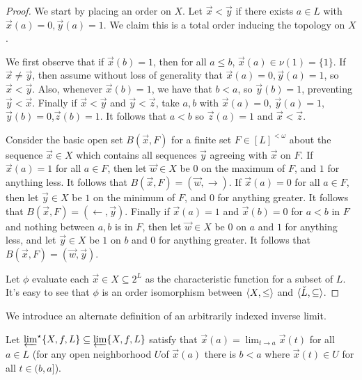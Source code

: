 \documentclass[11pt]{article}
\begin{document}
  \begin{proof}
    We start by placing an order on \(X\). Let \(\vec x<\vec y\) if
    there exists \(a\in L\) with \(\vec x(a)=0,\vec y(a)=1\). We claim this is
    a total order inducing the topology on \(X\).

    We first observe that if \(\vec x(b)=1\), then for all \(a\leq b\),
    \(\vec x(a)\in\nu(1)=\{1\}\). If \(\vec x\not=\vec y\), then assume
    without loss of generality that \(\vec x(a)=0,\vec y(a)=1\), so
    \(\vec x<\vec y\). Also, whenever \(\vec x(b)=1\), we have that \(b<a\),
    so \(\vec y(b)=1\), preventing \(\vec y<\vec x\). Finally if
    \(\vec x<\vec y\) and \(\vec y<\vec z\), take \(a,b\) with
    \(\vec x(a)=0\), \(\vec y(a)=1\),\(\vec y(b)=0\),\(\vec z(b)=1\). It
    follows that \(a<b\) so \(\vec z(a)=1\) and \(\vec x<\vec z\).

    Consider the basic open set \(B(\vec x,F)\) for a finite set
    \(F\in [L]^{<\omega}\)
    about the sequence \(\vec x\in X\) which contains all sequences
    \(\vec y\) agreeing with \(\vec x\) on \(F\). If \(\vec x(a)=1\) for all
    \(a\in F\), then let \(\vec w\in X\) be \(0\) on the maximum of \(F\),
    and \(1\) for anything less. It follows that
    \(B(\vec x,F)=(\vec w,\rightarrow)\). If \(\vec x(a)=0\) for all
    \(a\in F\), then let \(\vec y\in X\) be \(1\) on the minimum of \(F\),
    and \(0\) for anything greater. It follows that
    \(B(\vec x,F)=(\leftarrow,\vec y)\). Finally if \(\vec x(a)=1\) and
    \(\vec x(b)=0\) for \(a<b\) in \(F\) and nothing between \(a,b\) is in
    \(F\), then let \(\vec w\in X\) be \(0\) on \(a\)
    and \(1\) for anything less, and let \(\vec y\in X\) be \(1\) on \(b\)
    and \(0\) for anything greater. It follows that
    \(B(\vec x,F)=(\vec w,\vec y)\).

    Let \(\phi\) evaluate each \(\vec x\in X\subseteq 2^L\) as the
    characteristic function for a subset of \(L\). It's easy to see that
    \(\phi\) is an order isomorphism between \(\langle X,\leq\rangle\) and
    \(\langle\check L,\subseteq\rangle\).
  \end{proof}

  We introduce an alternate definition of an arbitrarily indexed
  inverse limit.

  \begin{definition}
    Let \(\varprojlim^\star\{X,f,L\}\subseteq\varprojlim\{X,f,L\}\) satisfy
    that \(\vec x(a)=\lim_{t\to a}\vec x(t)\) for all \(a\in L\)
    (for any open neighborhood
    \(U\)of \(\vec x(a)\) there is \(b<a\) where \(\vec x(t)\in U\)
    for all \(t\in(b,a]\)).
  \end{definition}
\end{document}
